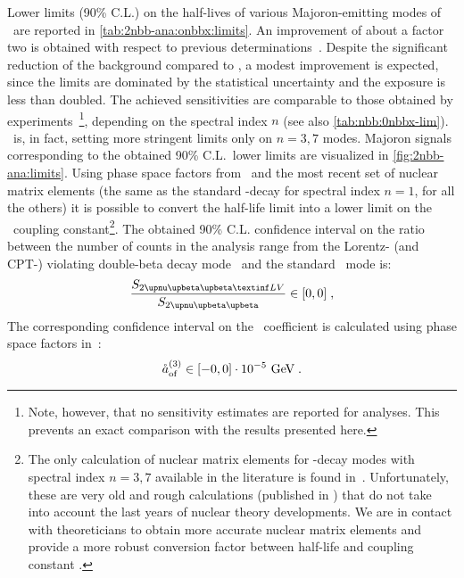 Lower limits (90\% C.L.) on the half-lives of various Majoron-emitting modes of \onbb\ are
reported in \cref{tab:2nbb-ana:onbbx:limits}. An improvement of about a factor two is
obtained with respect to previous determinations~\cite{Agostini2015a}. Despite the
significant reduction of the background compared to \phaseone, a modest improvement is
expected, since the limits are dominated by the statistical uncertainty and the exposure
is less than doubled. The achieved sensitivities are comparable to those obtained by
 experiments~\cite{Gando2012, Albert2014a}\footnote{%
  Note, however, that no sensitivity estimates are reported for  analyses.
  This prevents an exact comparison with the results presented here.
}, depending on the spectral index $n$ (see also
\cref{tab:nbb:0nbbx-lim}). \gerda\ is, in fact, setting more stringent limits only on $n=3,7$
modes. Majoron signals corresponding to the obtained 90\% C.L.~lower limits are visualized
in \cref{fig:2nbb-ana:limits}. 
\newpar
Using phase space factors from~\cite{Kotila2015} and the most recent set of nuclear matrix
elements (the same as the standard \onbb-decay for spectral index $n=1$, \cite{Hirsch1995}
for all the others) it is possible to convert the half-life limit into a lower limit on
the \ga\ coupling constant\footnote{%
  The only calculation of nuclear matrix elements for \onbbx-decay modes with spectral
  index $n=3,7$ available in the literature is found in~\cite{Hirsch1995}. Unfortunately,
  these are very old and rough calculations (published in ) that do not take into
  account the last  years of nuclear theory developments. We are in contact with
  theoreticians to obtain more accurate nuclear matrix elements and provide a more robust
  conversion factor between half-life and coupling constant \ga.
}.
\newpar
The obtained 90\% C.L. confidence interval on the ratio between the number of counts in
the analysis range from the Lorentz- (and CPT-) violating double-beta decay mode \nnbblv\
and the standard \nnbb\ mode is:
\[
  \frac{S_\nnbblvM}{S_\nnbbM} \in [0,0] \;,
\]
The corresponding confidence interval on the \aof\ coefficient is calculated using phase
space factors in~\cite{Nitescu2020}:
\[
  {\mathring{a}_\text{of}^{(3)}} \in [-0, 0] \cdot 10^{-5}~\text{GeV} \;.
\]

\begin{table}
  \centering
  \caption{%
    90\% C.L.~lower limits for Majoron-emitting \onbb\ modes contributing to the \nnbb\
    event distribution. Nuclear matrix elements for spectral index $n=1$ are the same as
    the standard \onbb, and have been therefore selected from the most recent nuclear
    calculations.  Matrix elements for the other decay modes have been taken
    from~\cite{Hirsch1995}.  Phase space factors have been taken from~\cite{Kotila2015}.
    \fillme{numbers}
  }\label{tab:2nbb-ana:onbbx:limits}
  
\end{table}

